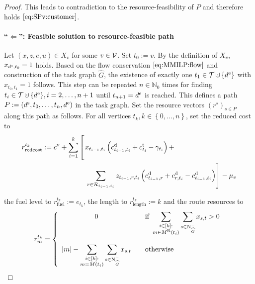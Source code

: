 \begin{proof}
This leads to contradiction to the resource-feasibility of $P$ and therefore holds $\eqref{eq:SPv:customer}$.

\paragraph{\enquote{$\boldsymbol{\Leftarrow}$}: Feasible solution to resource-feasible path} \proofparfill

Let $(x,z,e,u)\in X_v$ for some $v\in\mathcal{V}$. Set ${t_0 := v}$. By the definition of $X_v$, ${x_{d^{\operatorname{s}},t_0} = 1}$ holds. Based on the flow conservation $\eqref{eq:MMILP:flow}$ and construction of the task graph $\widehat{G}$, the existence of exactly one ${t_1\in\mathcal{T}\cupdot\left\{\de\right\}}$ with ${x_{t_0,t_1} = 1}$ follows. This step can be repeated ${n\in\mathbb{N}_0}$ times for finding ${t_i\in\mathcal{T}\cupdot\left\{\de\right\}}, {i = 2,\dots,n+1}$ until ${t_{n+1}=d^{\operatorname{e}}}$ is reached. This defines a path ${P:=\left(d^{\operatorname{s}},t_0,\dots,t_n,d^{\operatorname{e}}\right)}$ in the task graph. Set the resource vectors $\left(r^s\right)_{s\in P}$ along this path as follows. For all vertices $t_k, {k\in\left\{0,\dots,n\right\}}$, set the reduced cost to
\begin{align*}
	r^{t_k}_{\operatorname{redcost}} := \cv + \sum_{i=1}^k\left[ \vphantom{\sum_{r\in\mathcal{R}_{t_{i-1}}}} \right. & x_{t_{i-1},t_i}\left(\cd_{t_{i-1},t_i}+\ct_{t_i}-\gamma_{t_i}\right) + \\
	& \left. \sum_{r\in\mathcal{R}_{t_{i-1},t_i}} z_{t_{i-1},r,t_i}\left(\cd_{t_{i-1},r}+\cd_{r,t_i}-\cd_{t_{i-1},t_i}\right)\right] - \mu_v
\end{align*}

the fuel level to ${r^{t_k}_{\operatorname{fuel}} := e_{t_k}}$, the length to ${r^{t_k}_{\operatorname{length}} := k}$ and the route resources to
\begin{align*}
	r^{t_k}_m = \left\{\begin{array}{ccl}
		0 && \displaystyle{\text{if } \sum_{ \substack{i\in[k]: \\ m\in M^{\operatorname{R}}\left(t_i\right)} } \sum_{s\in\operatorname{N}^-_{\widehat{G}}} x_{s,t} > 0} \\ \\
		\displaystyle{\vert m\vert - \sum_{ \substack{i\in[k]: \\ m = M\left(t_i\right)} } \sum_{s\in\operatorname{N}^-_{\widehat{G}}} x_{s,t}} && \text{otherwise}
	\end{array}\right.
\end{align*}


\end{proof}
